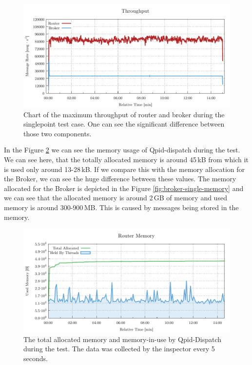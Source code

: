\begin{figure}[H]
	\centering
	\includegraphics[width=1\linewidth]{obrazky-figures/charts/singlepoint-throughput.pdf}
	\caption{Chart of the maximum throughput of router and broker during the singlepoint test case. One can see the significant difference between those two components.}
	\label{fig:rate-single}
\end{figure}

In the Figure \ref{fig:router-single-memory} we can see the memory usage of Qpid-dispatch during the test. We can see here, that the totally allocated memory is around 45\,kB from which it is used only around 13-28\,kB. If we compare this with the memory allocation for the Broker, we can see the huge difference between these values. The memory allocated for the Broker is depicted in the Figure \ref{fig:broker-single-memory} and we can see that the allocated memory is around 2\,GB of memory and used memory is around 300-900\,MB. This is caused by messages being stored in the memory.

\begin{figure}[H]
	\centering
	\includegraphics[width=1\linewidth]{obrazky-figures/charts/singlepoint-router-throughput-memory.pdf}
	\caption{The total allocated memory and memory-in-use by Qpid-Dispatch during the test. The data was collected by the inspector every 5\,seconds.}
	\label{fig:router-single-memory}
\end{figure}

